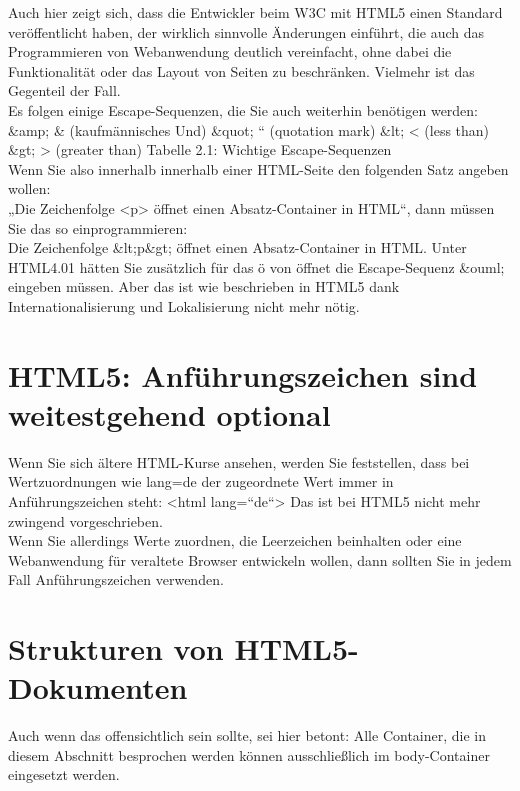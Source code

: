 Auch hier zeigt sich, dass die Entwickler beim W3C mit HTML5 einen Standard veröffentlicht haben, der wirklich sinnvolle Änderungen einführt, die auch das Programmieren von Webanwendung deutlich vereinfacht, ohne dabei die Funktionalität oder das Layout von Seiten zu beschränken. Vielmehr ist das Gegenteil der Fall.\\

Es folgen einige Escape-Sequenzen, die Sie auch weiterhin benötigen werden:\\


\&amp;	\& (kaufmännisches Und)
\&quot;	`` (quotation mark)
\&lt;	< (less than)
\&gt;	> (greater than)
Tabelle 2.1: Wichtige Escape-Sequenzen\\

Wenn Sie also innerhalb innerhalb einer HTML-Seite den folgenden Satz angeben wollen:\\
 
„Die Zeichenfolge <p> öffnet einen Absatz-Container in HTML“, 
dann müssen Sie das so einprogrammieren:\\
Die Zeichenfolge \&lt;p\&gt; öffnet einen Absatz-Container in HTML.
Unter HTML4.01 hätten Sie zusätzlich für das ö von öffnet die Escape-Sequenz \&ouml; eingeben müssen. Aber das ist wie beschrieben in HTML5 dank Internationalisierung und Lokalisierung nicht mehr nötig.

\section{HTML5: Anführungszeichen sind weitestgehend optional}

Wenn Sie sich ältere HTML-Kurse ansehen, werden Sie feststellen, dass bei Wertzuordnungen wie lang=de der zugeordnete Wert immer in Anführungszeichen steht: <html lang=``de``> Das ist bei HTML5 nicht mehr zwingend vorgeschrieben. \\

Wenn Sie allerdings Werte zuordnen, die Leerzeichen beinhalten oder eine Webanwendung für veraltete Browser entwickeln wollen, dann sollten Sie in jedem Fall Anführungszeichen verwenden.

\section{Strukturen von HTML5-Dokumenten}

Auch wenn das offensichtlich sein sollte, sei hier betont: Alle Container, die in diesem Abschnitt besprochen werden können ausschließlich im body-Container eingesetzt werden.\\

